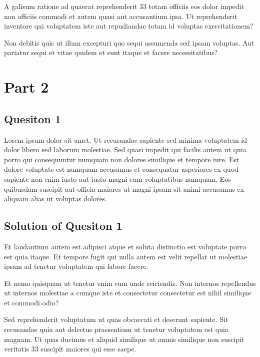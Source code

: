 \documentclass[11pt]{article}
\begin{document}
\begin{center}
\begin{tikzpicture}[x=0.75pt,y=0.75pt,yscale=-1,xscale=1]
\end{tikzpicture}

A galisum ratione ad quaerat reprehenderit 33 totam officiis eos dolor impedit non officiis commodi et autem quasi aut accusantium ipsa. Ut reprehenderit inventore qui voluptatem iste aut repudiandae totam id voluptas exercitationem?

Non debitis quis ut illum excepturi quo sequi assumenda sed ipsam voluptas. Aut pariatur sequi et vitae quidem et sunt itaque et facere necessitatibus?

\end{center}


\section*{Part 2}

\subsection*{Quesiton 1}

Lorem ipsum dolor sit amet. Ut recusandae sapiente sed minima voluptatem id dolor libero sed laborum molestiae. Sed quasi impedit qui facilis autem ut quia porro qui consequuntur numquam non dolores similique et tempore iure. Est dolore voluptate est numquam accusamus et consequatur asperiores ex quod sapiente non enim iusto aut iusto magni eum voluptatibus numquam. Eos quibusdam suscipit aut officia maiores ut magni ipsam sit animi accusamus ex aliquam alias ut voluptas dolores.


\subsection*{Solution of Quesiton 1}

Et laudantium autem est adipisci atque et soluta distinctio est voluptate porro est quia itaque. Et tempore fugit qui nulla autem est velit repellat ut molestiae ipsam ad tenetur voluptatem qui labore facere.

Et nemo quisquam ut tenetur enim cum unde reiciendis. Non internos repellendus ut internos molestiae a cumque iste et consectetur consectetur est nihil similique et commodi odio?

Sed reprehenderit voluptatum ut quas obcaecati et deserunt sapiente. Sit recusandae quia aut delectus praesentium ut tenetur voluptatem est quia magnam. Ut quas ducimus et aliquid similique ut omnis similique non suscipit veritatis 33 suscipit maiores qui esse saepe.
\end{document}
